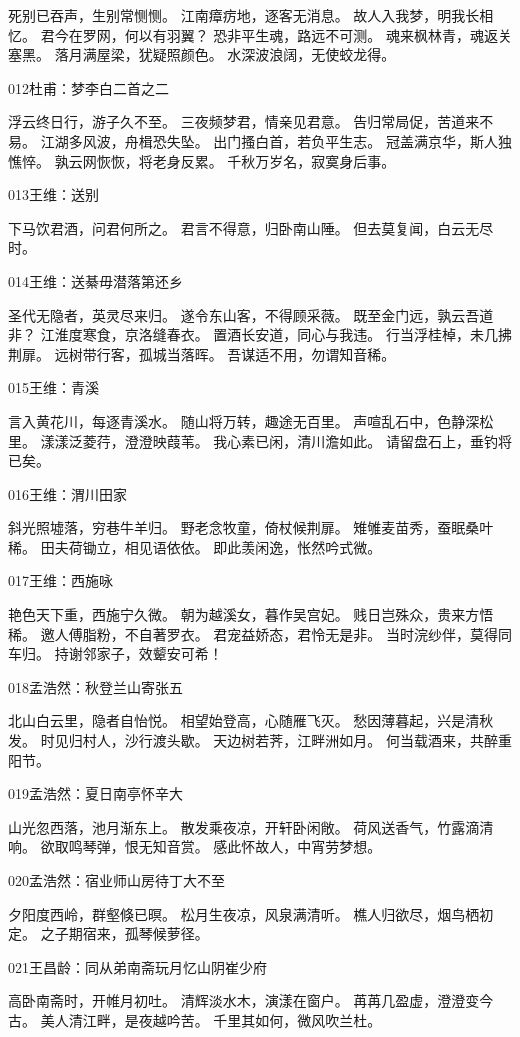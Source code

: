 死别已吞声，生别常恻恻。
江南瘴疠地，逐客无消息。
故人入我梦，明我长相忆。
君今在罗网，何以有羽翼？
恐非平生魂，路远不可测。
魂来枫林青，魂返关塞黑。
落月满屋梁，犹疑照颜色。
水深波浪阔，无使蛟龙得。

012杜甫：梦李白二首之二

浮云终日行，游子久不至。
三夜频梦君，情亲见君意。
告归常局促，苦道来不易。
江湖多风波，舟楫恐失坠。
出门搔白首，若负平生志。
冠盖满京华，斯人独憔悴。
孰云网恢恢，将老身反累。
千秋万岁名，寂寞身后事。

013王维：送别

下马饮君酒，问君何所之。
君言不得意，归卧南山陲。
但去莫复闻，白云无尽时。

014王维：送綦毋潜落第还乡

圣代无隐者，英灵尽来归。
遂令东山客，不得顾采薇。
既至金门远，孰云吾道非？
江淮度寒食，京洛缝春衣。
置酒长安道，同心与我违。
行当浮桂棹，未几拂荆扉。
远树带行客，孤城当落晖。
吾谋适不用，勿谓知音稀。

015王维：青溪

言入黄花川，每逐青溪水。
随山将万转，趣途无百里。
声喧乱石中，色静深松里。
漾漾泛菱荇，澄澄映葭苇。
我心素已闲，清川澹如此。
请留盘石上，垂钓将已矣。

016王维：渭川田家

斜光照墟落，穷巷牛羊归。
野老念牧童，倚杖候荆扉。
雉雊麦苗秀，蚕眠桑叶稀。
田夫荷锄立，相见语依依。
即此羡闲逸，怅然吟式微。

017王维：西施咏

艳色天下重，西施宁久微。
朝为越溪女，暮作吴宫妃。
贱日岂殊众，贵来方悟稀。
邀人傅脂粉，不自著罗衣。
君宠益娇态，君怜无是非。
当时浣纱伴，莫得同车归。
持谢邻家子，效颦安可希！

018孟浩然：秋登兰山寄张五

北山白云里，隐者自怡悦。
相望始登高，心随雁飞灭。
愁因薄暮起，兴是清秋发。
时见归村人，沙行渡头歇。
天边树若荠，江畔洲如月。
何当载酒来，共醉重阳节。

019孟浩然：夏日南亭怀辛大

山光忽西落，池月渐东上。
散发乘夜凉，开轩卧闲敞。
荷风送香气，竹露滴清响。
欲取鸣琴弹，恨无知音赏。
感此怀故人，中宵劳梦想。

020孟浩然：宿业师山房待丁大不至

夕阳度西岭，群壑倏已暝。
松月生夜凉，风泉满清听。
樵人归欲尽，烟鸟栖初定。
之子期宿来，孤琴候萝径。

021王昌龄：同从弟南斋玩月忆山阴崔少府

高卧南斋时，开帷月初吐。
清辉淡水木，演漾在窗户。
苒苒几盈虚，澄澄变今古。
美人清江畔，是夜越吟苦。
千里其如何，微风吹兰杜。

